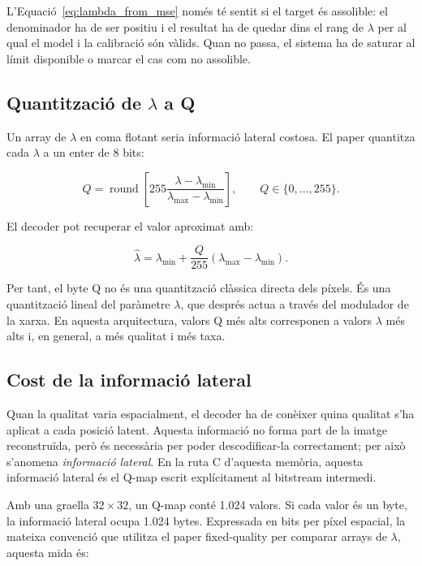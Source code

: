 L'Equació~\ref{eq:lambda_from_mse} només té sentit si el target és assolible:
el denominador ha de ser positiu i el resultat ha de quedar dins el rang de
$\lambda$ per al qual el model i la calibració són vàlids. Quan no passa, el
sistema ha de saturar al límit disponible o marcar el cas com no assolible.

\subsection{Quantització de \texorpdfstring{$\lambda$}{lambda} a Q}

Un array de $\lambda$ en coma flotant seria informació lateral costosa. El paper
quantitza cada $\lambda$ a un enter de 8 bits:

\begin{equation}
Q=
\operatorname{round}\left[
255\frac{\lambda-\lambda_{\min}}
{\lambda_{\max}-\lambda_{\min}}
\right],
\qquad Q\in\{0,\ldots,255\}.
\label{eq:lambda_to_q}
\end{equation}

El decoder pot recuperar el valor aproximat amb:

\begin{equation}
\hat{\lambda}=
\lambda_{\min}+
\frac{Q}{255}
(\lambda_{\max}-\lambda_{\min}).
\label{eq:q_to_lambda}
\end{equation}

Per tant, el byte Q no és una quantització clàssica directa dels píxels. És una
quantització lineal del paràmetre $\lambda$, que després actua a través del
modulador de la xarxa. En aquesta arquitectura, valors Q més alts corresponen a
valors $\lambda$ més alts i, en general, a més qualitat i més taxa.

\subsection{Cost de la informació lateral}

Quan la qualitat varia espacialment, el decoder ha de conèixer quina qualitat
s'ha aplicat a cada posició latent. Aquesta informació no forma part de la
imatge reconstruïda, però és necessària per poder descodificar-la correctament;
per això s'anomena \emph{informació lateral}. En la ruta C d'aquesta memòria,
aquesta informació lateral és el Q-map escrit explícitament al bitstream
intermedi.

Amb una graella $32\times32$, un Q-map conté 1.024 valors. Si cada valor és un
byte, la informació lateral ocupa 1.024 bytes. Expressada en bits per píxel
espacial, la mateixa convenció que utilitza el paper fixed-quality per comparar
arrays de $\lambda$, aquesta mida és:


